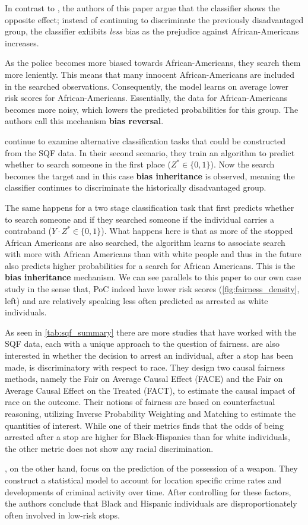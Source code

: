 In contrast to \cite{kallus2018}, the authors of this paper argue that the classifier shows the opposite effect; instead of continuing to discriminate the previously disadvantaged group, the classifier exhibits \textit{less} bias as the prejudice against African-Americans increases.\par
As the police becomes more biased towards African-Americans, they search them more leniently. This means that many innocent African-Americans are included in the searched observations. Consequently, the model learns on average lower risk scores for African-Americans. Essentially, the data for African-Americans becomes more noisy, which lowers the predicted probabilities for this group. The authors call this mechanism \textbf{bias reversal}.

\cite{rambachan2016} continue to examine alternative classification tasks that could be constructed from the SQF data. In their second scenario, they train an algorithm to predict whether to search someone in the first place ($Z^* \in \{0, 1\}$). Now the search becomes the target and in this case \textbf{bias inheritance} is observed, meaning the classifier continues to discriminate the historically disadvantaged group.\par
The same happens for a two stage classification task that first predicts whether to search someone and if they searched someone if the individual carries a contraband ($Y \cdot Z^* \in \{0, 1\}$). What happens here is that as more of the stopped African Americans are also searched, the algorithm learns to associate search with more with African Americans than with white people and thus in the future also predicts higher probabilities for a search for African Americans. This is the \textbf{bias inheritance} mechanism.
We can see parallels to this paper to our own case study in the sense that, PoC indeed have lower risk scores (\autoref{fig:fairness_density}, left) and are relatively speaking less often predicted as arrested as white individuals.

As seen in \autoref{tab:sqf_summary} there are more studies that have worked with the SQF data, each with a unique approach to the question of fairness. \cite{Khademi2019FADMELC} are also interested in whether the decision to arrest an individual, after a stop has been made, is discriminatory with respect to race. They design two causal fairness methods, namely the Fair on Average Causal Effect (FACE) and the Fair on Average Causal Effect on the Treated (FACT), to estimate the causal impact of race on the outcome. Their notions of fairness are based on counterfactual reasoning, utilizing Inverse Probability Weighting and Matching to estimate the quantities of interest.
While one of their metrics finds that the odds of being arrested after a stop are higher for Black-Hispanics than for white individuals, the other metric does not show any racial discrimination.\par
\cite{goel2016}, on the other hand, focus on the prediction of the possession of a weapon. They construct a statistical model to account for location specific crime rates and developments of criminal activity over time. After controlling for these factors, the authors conclude that Black and Hispanic individuals are disproportionately often involved in low-risk stops.
